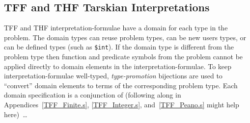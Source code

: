 \documentclass{easychair}
\begin{document}
\subsection{TFF and THF Tarskian Interpretations}
\label{NewTarskianTFFTHF}

TFF and THF interpretation-formulae have a domain for each type in the problem.
The domain types can reuse problem types, can be new users types, or can be defined types
(such as {\tt \$int}).
If the domain type is different from the problem type then function and predicate symbols from 
the problem cannot be applied directly to domain elements in the interpretation-formulae.
To keep interpretation-formulae well-typed, {\em type-promotion} bijections are used to ``convert'' 
domain elements to terms of the corresponding problem type.
Each domain specification is a conjunction of (following along in Appendices~\ref{TFF_Finite.s}, 
\ref{TFF_Integer.s}, and~\ref{TFF_Peano.s} might help here)~\ldots
\end{document}
